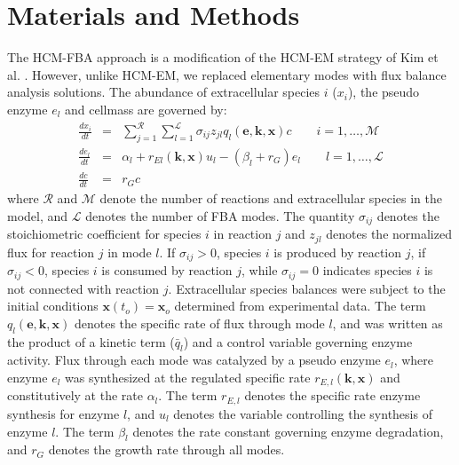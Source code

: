\documentclass[10pt,twocolumn,twoside,final]{IEEEtran}
\begin{document}

\section{Materials and Methods}
The HCM-FBA approach is a modification of the HCM-EM strategy of Kim et al. \cite{2008_kim_varner_ramkrishna_BiotechProg}. However, unlike HCM-EM, we replaced elementary modes with flux balance analysis solutions. The abundance of extracellular species $i$ ($x_{i}$), the pseudo enzyme $e_{l}$ and cellmass are governed by:
\begin{eqnarray}\nonumber
	\frac{dx_{i}}{dt}  & = &  \sum_{j = 1}^{\mathcal{R}}\sum_{l = 1}^{\mathcal{L}}\sigma_{ij}z_{jl}q_{l}\left(\mathbf{e},\mathbf{k},\mathbf{x}\right)c \qquad{i=1,\hdots,\mathcal{M}}\\\nonumber
  \frac{de_{l}}{dt}  & = & \alpha_{l} + r_{El}\left(\mathbf{k},\mathbf{x}\right)u_{l} - \left(\beta_{l}+r_{G}\right)e_{l} \qquad l=1,\hdots,\mathcal{L} \\\nonumber
  \frac{dc}{dt} & = & r_{G}c
\end{eqnarray}
where $\mathcal{R}$ and $\mathcal{M}$ denote the number of reactions and extracellular species in the model, and $\mathcal{L}$ denotes the number of FBA modes.
The quantity $\sigma_{ij}$ denotes the stoichiometric coefficient for species $i$ in reaction $j$ and $z_{jl}$ denotes the normalized flux for reaction $j$ in mode $l$.
If $\sigma_{ij}>0$, species $i$ is produced by reaction $j$,
if $\sigma_{ij}<0$, species $i$ is consumed by reaction $j$, while $\sigma_{ij} = 0$ indicates species $i$ is not connected with reaction $j$.
Extracellular species balances were subject to the initial conditions $\mathbf{x}\left(t_{o}\right) = \mathbf{x}_{o}$ determined from experimental data.
The term $q_{l}\left(\mathbf{e},\mathbf{k},\mathbf{x}\right)$ denotes the specific rate of flux through mode $l$, and was written as the product of a kinetic term ($\bar{q}_{l}$) and a  control variable governing enzyme activity. Flux through each mode was catalyzed by a pseudo enzyme $e_{l}$, where enzyme $e_{l}$ was synthesized at the regulated specific rate $r_{E,l}\left(\mathbf{k},\mathbf{x}\right)$ and constitutively at the rate $\alpha_{l}$. The term $r_{E,l}$ denotes the specific rate enzyme synthesis for enzyme $l$, and $u_{l}$ denotes the variable controlling the synthesis of enzyme $l$. The term $\beta_{l}$ denotes the rate constant governing enzyme degradation, and $r_{G}$ denotes the growth rate through all modes.
\end{document}
